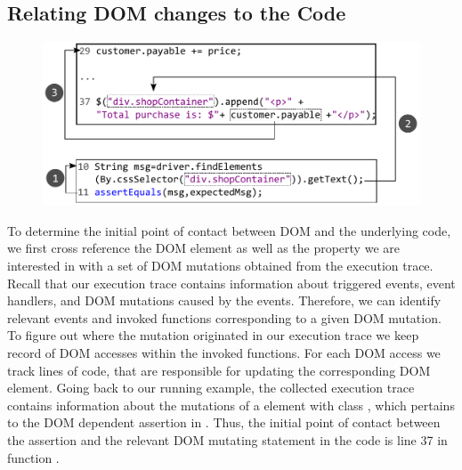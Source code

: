 \subsection{Relating DOM changes to the \javascript Code} \label{Sec:domToCode}

\begin{figure}[!t]
  \centering
  \includegraphics[width=1\hsize]{fig/candidateDOMExample}
  \vspace{-0.1in} 
  \label{Fig:candidateDOMExample}
  \vspace{-0.1in} 
\end{figure}
To determine the initial point of contact between DOM and the underlying \javascript code, we first cross reference the DOM element as well as the property we are interested in with a set of DOM mutations obtained from the execution trace. Recall that our execution trace contains information about triggered events, event handlers, and DOM mutations caused by the events. Therefore, we can identify relevant events and invoked functions corresponding to a given DOM mutation. To figure out where the mutation originated in our execution trace we keep record of DOM accesses within the invoked functions. For each DOM access we track \javascript lines of code, that are responsible for updating the corresponding DOM element.
Going back to our running example, the collected execution trace contains information about the mutations of a  element with class , which pertains to the DOM dependent assertion in . Thus, the initial point of contact between the assertion and the relevant DOM mutating statement in the \javascript code is line 37 in function .

